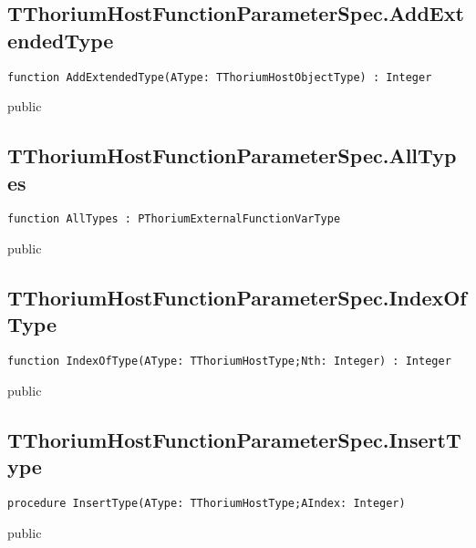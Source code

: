 \subsection{TThoriumHostFunctionParameterSpec.AddExtendedType}
\label{thoriumcore:thorium:tthoriumhostfunctionparameterspec:addextendedtype}
\begin{FPCList}
\Synopsis
\Declaration 

\begin{verbatim}
function AddExtendedType(AType: TThoriumHostObjectType) : Integer
\end{verbatim}
\Visibility
public
\Description
\Errors
\end{FPCList}
\subsection{TThoriumHostFunctionParameterSpec.AllTypes}
\label{thoriumcore:thorium:tthoriumhostfunctionparameterspec:alltypes}
\begin{FPCList}
\Synopsis
\Declaration 

\begin{verbatim}
function AllTypes : PThoriumExternalFunctionVarType
\end{verbatim}
\Visibility
public
\Description
\Errors
\end{FPCList}
\subsection{TThoriumHostFunctionParameterSpec.IndexOfType}
\label{thoriumcore:thorium:tthoriumhostfunctionparameterspec:indexoftype}
\begin{FPCList}
\Synopsis
\Declaration 

\begin{verbatim}
function IndexOfType(AType: TThoriumHostType;Nth: Integer) : Integer
\end{verbatim}
\Visibility
public
\Description
\Errors
\end{FPCList}
\subsection{TThoriumHostFunctionParameterSpec.InsertType}
\label{thoriumcore:thorium:tthoriumhostfunctionparameterspec:inserttype}
\begin{FPCList}
\Synopsis
\Declaration 

\begin{verbatim}
procedure InsertType(AType: TThoriumHostType;AIndex: Integer)
\end{verbatim}
\Visibility
public
\Description
\Errors
\end{FPCList}
